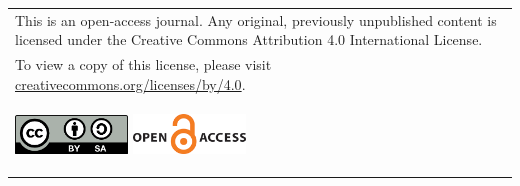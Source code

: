 \begin{footnotesize}
\vspace{2em}

\noindent\begin{tabular}{|p{\textwidth}|}
	\hline
	This is an open-access journal. 
	Any original, previously unpublished content is licensed under the Creative Commons Attribution 4.0 International License. \\
	To view a copy of this license, please visit \href{http://creativecommons.org/licenses/by/4.0/}{creativecommons.org/licenses/by/4.0}.\\
	\vspace{1em}
	\begin{center}
		\includegraphics[width=3cm]{preamble/CC4-0} \hspace{3em}
		\includegraphics[width=3cm]{preamble/OpenAccess3.png}
\end{center}\\
	\hline
\end{tabular}


\end{footnotesize}